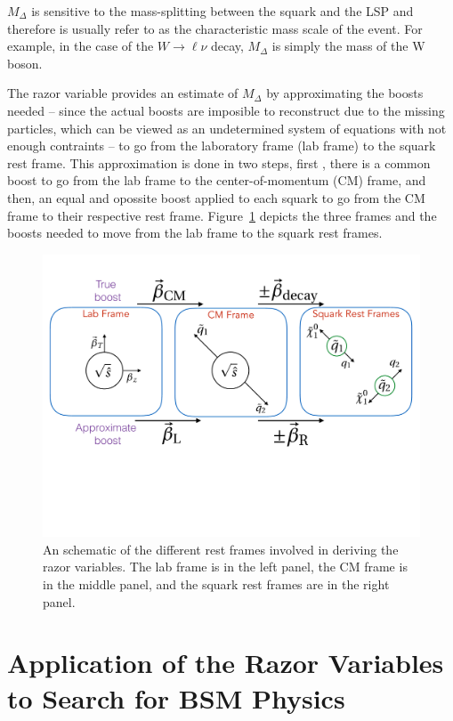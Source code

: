 $M_{\Delta}$ is sensitive to the mass-splitting between the squark and
the LSP  and therefore is usually refer to as the characteristic mass
scale of the event. For example, in the case of the $W\rightarrow
\ell\nu$ decay, $M_{\Delta}$ is simply the mass of the W boson.

The razor variable \MR provides an estimate of $M_{\Delta}$ by
approximating the boosts needed -- since the actual boosts are
imposible to reconstruct due to the missing particles, which can be
viewed as an undetermined system of equations with not enough
contraints -- to go from the laboratory frame (lab frame) to the
squark rest frame. This approximation is done in two steps, first
, there is a common boost to go from the lab frame to the
center-of-momentum (CM) frame, and then, an equal and opossite boost
applied to each squark to go from the CM frame to their respective
rest frame. Figure~\ref{fig:restFrames} depicts the three frames and
the boosts needed to move from the lab frame to the squark rest frames.
\begin{figure}
 \centering
\includegraphics[width=1.0\textwidth]{RazorVariables/RazorFrameDiagram.pdf}
 \caption{An schematic of the  different rest frames involved in
   deriving the razor variables. The lab frame is in the left panel,
   the CM frame is in the middle panel, and the  squark rest frames
   are in the right panel.\label{fig:restFrames}}
\end{figure}  


\section{Application of the Razor Variables to Search for BSM Physics}\label{razorApp}

